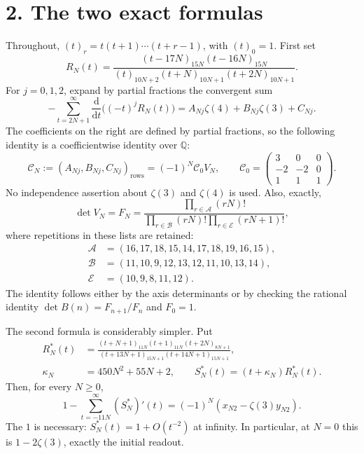 \documentclass[11pt]{article}
\newcommand{\Q}{\mathbb Q}
\newcommand{\dd}{\mathrm d}
\begin{document}
\section*{2. The two exact formulas}
Throughout, $(t)_r=t(t+1)\cdots(t+r-1)$, with $(t)_0=1$.
First set
\[
 R_N(t)=\frac{(t-17N)_{15N}(t-16N)_{15N}}
 {(t)_{10N+2}(t+N)_{10N+1}(t+2N)_{10N+1}}.
\]
For $j=0,1,2$, expand by partial fractions the convergent sum
\[
 -\sum_{t=2N+1}^{\infty}\frac{\dd}{\dd t}\bigl((-t)^jR_N(t)\bigr)
 =A_{Nj}\zeta(4)+B_{Nj}\zeta(3)+C_{Nj}.
\]
The coefficients on the right are defined by partial fractions, so the
following identity is a coefficientwise identity over $\Q$:
\begin{equation}\label{eq:originalidentity}
 \mathcal C_N:=(A_{Nj},B_{Nj},C_{Nj})_{\text{rows}}
 =(-1)^N\mathcal C_0V_N,\qquad
 \mathcal C_0=\begin{pmatrix}3&0&0\\-2&-2&0\\1&1&1\end{pmatrix}.
\end{equation}
No independence assertion about $\zeta(3)$ and $\zeta(4)$ is used.
Also, exactly,
\begin{equation}\label{eq:det}
 \det V_N=F_N=
 \frac{\prod_{r\in\mathcal A}(rN)!}
 {\prod_{r\in\mathcal B}(rN)!\prod_{r\in\mathcal E}(rN+1)!},
\end{equation}
where repetitions in these lists are retained:
\begin{align*}
 \mathcal A&=(16,17,18,15,14,17,18,19,16,15),\\
 \mathcal B&=(11,10,9,12,13,12,11,10,13,14),\\
 \mathcal E&=(10,9,8,11,12).
\end{align*}
The identity follows either by the axis determinants or by checking the
rational identity $\det B(n)=F_{n+1}/F_n$ and $F_0=1$.

The second formula is considerably simpler. Put
\begin{align*}
 R_N^*(t)&=\frac{(t+N+1)_{11N}(t+1)_{11N}(t+2N)_{8N+1}}
 {(t+13N+1)_{15N+1}(t+14N+1)_{15N+1}},\\
 \kappa_N&=450N^2+55N+2,\qquad S_N^*(t)=(t+\kappa_N)R_N^*(t).
\end{align*}
Then, for every $N\ge0$,
\begin{equation}\label{eq:dualidentity}
 1-\sum_{t=-11N}^{\infty}(S_N^*)'(t)
       =(-1)^N(x_{N2}-\zeta(3)y_{N2}).
\end{equation}
The $1$ is necessary: $S_N^*(t)=1+O(t^{-2})$ at infinity. In particular,
at $N=0$ this is $1-2\zeta(3)$, exactly the initial readout.
\end{document}
